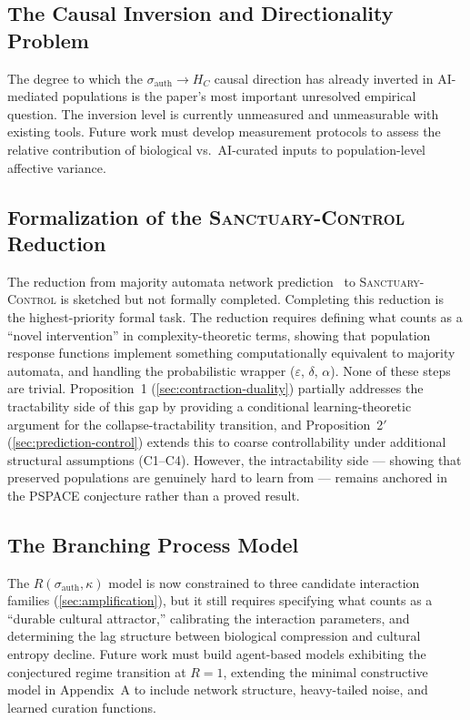 \documentclass[11pt, a4paper]{article}
\theoremstyle{remark}
\newcommand{\SC}{\textsc{Sanctuary-Control}}
\begin{document}
\subsection{The Causal Inversion and Directionality Problem}\label{sec:lim-causal}

The degree to which the $\sigma_{\text{auth}} \to H_C$ causal direction has already inverted in AI-mediated populations is the paper's most important unresolved empirical question. The inversion level is currently unmeasured and unmeasurable with existing tools. Future work must develop measurement protocols to assess the relative contribution of biological vs.\ AI-curated inputs to population-level affective variance.

\subsection{Formalization of the \texorpdfstring{\textsc{Sanctuary-Control}}{Sanctuary-Control} Reduction}\label{sec:lim-reduction}

The reduction from majority automata network prediction~\cite{goles2016} to \SC{} is sketched but not formally completed. Completing this reduction is the highest-priority formal task. The reduction requires defining what counts as a ``novel intervention'' in complexity-theoretic terms, showing that population response functions implement something computationally equivalent to majority automata, and handling the probabilistic wrapper ($\varepsilon$, $\delta$, $\alpha$). None of these steps are trivial. Proposition~1 (\cref{sec:contraction-duality}) partially addresses the tractability side of this gap by providing a conditional learning-theoretic argument for the collapse-tractability transition, and Proposition~2$'$ (\cref{sec:prediction-control}) extends this to coarse controllability under additional structural assumptions (C1--C4). However, the intractability side --- showing that preserved populations are genuinely hard to learn from --- remains anchored in the PSPACE conjecture rather than a proved result.

\subsection{The Branching Process Model}\label{sec:lim-branching}

The $R(\sigma_{\text{auth}}, \kappa)$ model is now constrained to three candidate interaction families (\cref{sec:amplification}), but it still requires specifying what counts as a ``durable cultural attractor,'' calibrating the interaction parameters, and determining the lag structure between biological compression and cultural entropy decline. Future work must build agent-based models exhibiting the conjectured regime transition at $R = 1$, extending the minimal constructive model in Appendix~A to include network structure, heavy-tailed noise, and learned curation functions.
\end{document}
